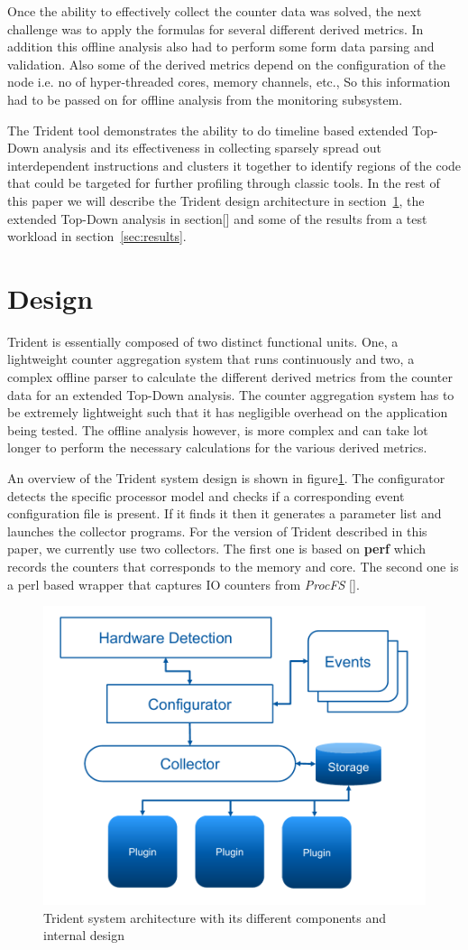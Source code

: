\documentclass{webofc}
\begin{document}
Once the ability to effectively collect the counter data was solved, the next challenge was to apply the formulas for several different derived metrics. In addition this offline analysis also had to perform some form data parsing and validation. Also some of the derived metrics depend on the configuration of the node i.e. no of hyper-threaded cores, memory channels, etc., So this information had to be passed on for offline analysis from the monitoring subsystem. 

The Trident tool demonstrates the ability to do timeline based extended Top-Down analysis and its effectiveness in collecting sparsely spread out interdependent instructions and clusters it together to identify regions of the code that could be targeted for further profiling through classic tools. In the rest of this paper we will describe the Trident design architecture in section~\ref{sec:design}, the extended Top-Down analysis in section[] and some of the results from a test workload in section~\ref{sec:results}.


\section{Design}
\label{sec:design}

Trident is essentially composed of two distinct functional units. One, a lightweight counter aggregation system that runs continuously and two, a complex offline parser to calculate the different derived metrics from the counter data for an extended Top-Down analysis. The counter aggregation system has to be extremely lightweight such that it has negligible overhead on the application being tested. The offline analysis however, is more complex and can take lot longer to perform the necessary calculations for the various derived metrics. 

An overview of the Trident system design is shown in figure\ref{fig:design}. The configurator detects the specific processor model and checks if a corresponding event configuration file is present. If it finds it then it generates a parameter list and launches the collector programs. For the version of Trident described in this paper, we currently use two collectors. The first one is based on \textbf{perf} which records the counters that corresponds to the memory and core. The second one is a perl based wrapper that captures IO counters from \textit{ProcFS} []. 

\begin{figure}
  \centering
	\captionsetup{justification=centering}
  \includegraphics[width=0.5\linewidth]{Design.pdf}
\caption{Trident system architecture with its different components and internal design}
\label{fig:design}
\end{figure}
\end{document}

